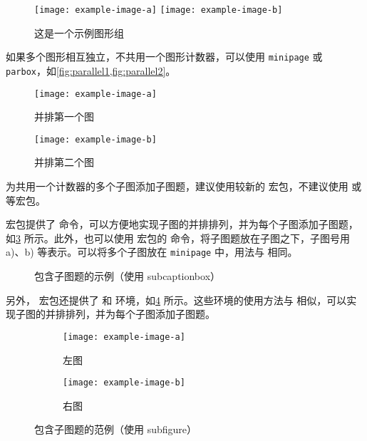 \begin{figure}[!htb]
  \centering
  \texttt{[image: example-image-a]}
  \hspace{1cm}
  \texttt{[image: example-image-b]}
  \caption{这是一个示例图形组}
  \label{fig:example-subfig-1}
\end{figure}

如果多个图形相互独立，不共用一个图形计数器，可以使用 \texttt{minipage} 或 \texttt{parbox}，如\ref{fig:parallel1,fig:parallel2}。

\begin{figure}[!htb]
  \begin{minipage}{0.4\textwidth}
    \centering
    \texttt{[image: example-image-a]}
    \caption{并排第一个图}
    \label{fig:parallel1}
  \end{minipage}\hfill
  \begin{minipage}{0.4\textwidth}
    \centering
    \texttt{[image: example-image-b]}
    \caption{并排第二个图}
    \label{fig:parallel2}
  \end{minipage}
\end{figure}

为共用一个计数器的多个子图添加子图题，建议使用较新的  宏包，不建议使用  或  等宏包。

 宏包提供了  命令，可以方便地实现子图的并排排列，并为每个子图添加子图题，如\ref{fig:subcaptionbox} 所示。此外，也可以使用  宏包的  命令，将子图题放在子图之下，子图号用 a)、b) 等表示。可以将多个子图放在 \texttt{minipage} 中，用法与  相同。

\begin{figure}[!htb]
  \centering
  \hspace{1cm}
  \caption{包含子图题的示例（使用 subcaptionbox）}
  \label{fig:subcaptionbox}
\end{figure}

另外， 宏包还提供了  和  环境，如\ref{fig:subfigure} 所示。这些环境的使用方法与  相似，可以实现子图的并排排列，并为每个子图添加子图题。

\begin{figure}[!htb]
  \centering
  \begin{subfigure}{0.3\textwidth}
    \centering
    \texttt{[image: example-image-a]}
    \caption{左图}
  \end{subfigure}
  \hspace{1cm}
  \begin{subfigure}{0.4\textwidth}
    \centering
    \texttt{[image: example-image-b]}
    \caption{右图}
  \end{subfigure}
  \caption{包含子图题的范例（使用 subfigure）}
  \label{fig:subfigure}
\end{figure}



